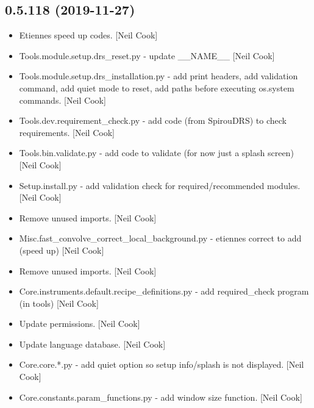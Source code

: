 \documentclass[a4paper,10pt,english]{report}
\begin{document}
\subsection{0.5.118 (2019-11-27)}
\label{\detokenize{misc/changelog:id23}}\begin{itemize}
\item {} 
Etiennes speed up codes. {[}Neil Cook{]}

\item {} 
Tools.module.setup.drs\_reset.py - update \_\_NAME\_\_ {[}Neil Cook{]}

\item {} 
Tools.module.setup.drs\_installation.py - add print headers, add
validation command, add quiet mode to reset, add paths before
executing os.system commands. {[}Neil Cook{]}

\item {} 
Tools.dev.requirement\_check.py - add code (from SpirouDRS) to check
requirements. {[}Neil Cook{]}

\item {} 
Tools.bin.validate.py - add code to validate (for now just a splash
screen) {[}Neil Cook{]}

\item {} 
Setup.install.py - add validation check for required/recommended
modules. {[}Neil Cook{]}

\item {} 
Remove unused imports. {[}Neil Cook{]}

\item {} 
Misc.fast\_convolve\_correct\_local\_background.py - etiennes correct to
add (speed up) {[}Neil Cook{]}

\item {} 
Remove unused imports. {[}Neil Cook{]}

\item {} 
Core.instruments.default.recipe\_definitions.py - add required\_check
program (in tools) {[}Neil Cook{]}

\item {} 
Update permissions. {[}Neil Cook{]}

\item {} 
Update language database. {[}Neil Cook{]}

\item {} 
Core.core.*.py - add quiet option so setup info/splash is not
displayed. {[}Neil Cook{]}

\item {} 
Core.constants.param\_functions.py - add window size function. {[}Neil
Cook{]}


\end{itemize}
\end{document}
